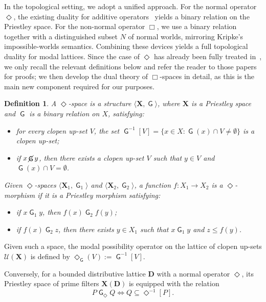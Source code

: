 \documentclass[10pt,a4paper]{amsart}
\newtheorem{definition}[theorem]{Definition}
\DeclareMathOperator{\G}{\mathsf{G}}
\DeclareMathOperator{\notG}{\cancel{ \G}}
\newcommand{\D}{\mathbf{D}}
\newcommand{\X}{\mathbf{X}}
\newcommand{\U}{\mathcal{U}}
\begin{document}
In the topological setting, we adopt a unified approach. For the normal operator $\Diamond$, the existing duality for additive operators~\cite{cignoli1991remarks, petrovich1996} yields a binary relation on the Priestley space. For the non-normal operator $\Box$, we use a binary relation together with a distinguished subset $N$ of normal worlds, mirroring Kripke's impossible-worlds semantics. Combining these devices yields a full topological duality for modal lattices. Since the case of $\Diamond$ has already been fully treated in~\cite{cignoli1991remarks, petrovich1996}, we only recall the relevant definitions below and refer the reader to those papers for proofs; we then develop the dual theory of $\Box$-spaces in detail, as this is the main new component required for our purposes.

\begin{definition}
\label{def:diamond-space}
A \emph{$\Diamond$-space} is a structure $\langle \X, \G \rangle$, where $\X$ is a Priestley space and $\G$ is a binary relation on $X$, satisfying:
\begin{itemize}
    \item for every clopen up-set $V$, the set $\G^{-1}[V]=\{x\in X:\G(x)\cap V\neq\emptyset\}$ is a clopen up-set;
    \item if $x\notG y$, then there exists a clopen up-set $V$ such that $y\in V$ and $\G(x)\cap V=\emptyset$.
\end{itemize}

Given $\Diamond$-spaces $\langle \X_1, \G_1 \rangle$ and $\langle \X_2, \G_2 \rangle$, a function
$f \colon X_1 \to X_2$ is a \emph{$\Diamond$-morphism} if it is a Priestley morphism satisfying:
\begin{itemize}
    \item if $x \G_1 y$, then $f(x) \G_2 f(y)$;
    \item if $f(x) \G_2 z$, then there exists $y \in X_1$ such that $x \G_1 y$ and $z \leq f(y)$.
\end{itemize}
\end{definition}

Given such a space, the modal possibility operator on the lattice of clopen up-sets $\U(\X)$ is defined by $\Diamond_{\G}(V) := \G^{-1}[V]$.

Conversely, for a bounded distributive lattice $\D$ with a normal operator $\Diamond$, its Priestley space of prime filters $\X(\D)$ is equipped with the relation
\[
    P\G_{\Diamond} Q \iff Q \subseteq \Diamond^{-1}[P].
\]
\end{document}
